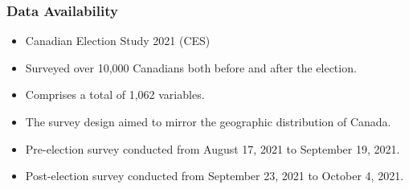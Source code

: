 \documentclass{beamer}
\begin{document}
\begin{frame}
    \frametitle{Data Availability}
    \begin{itemize}
        \item Canadian Election Study 2021 (CES)
        \item Surveyed over 10,000 Canadians both before and after the election.
        \item Comprises a total of 1,062 variables.
        \item The survey design aimed to mirror the geographic distribution of Canada.
        \item Pre-election survey conducted from August 17, 2021 to September 19, 2021.
        \item Post-election survey conducted from September 23, 2021 to October 4, 2021.
    \end{itemize}
\end{frame}


\end{document}
